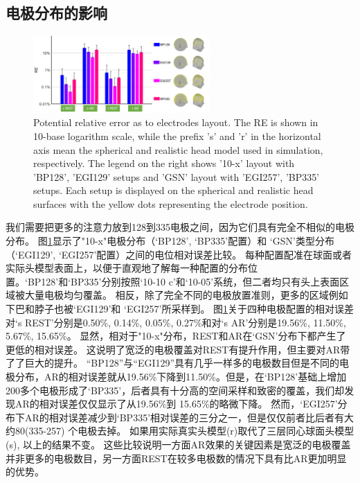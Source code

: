 \subsection{电极分布的影响}
\begin{figure}[h!]
	\centering
	\includegraphics[width=0.6\textwidth,natwidth=610,natheight=642]{pic/JNE/figure5.png}
	\caption{Potential relative error as to electrodes layout. The RE is shown in 10-base logarithm scale, while the prefix 's' and 'r' in the horizontal axis mean the spherical and realistic head model used in simulation, respectively. The legend on the right shows '10-x' layout with 'BP128', 'EGI129' setups and 'GSN' layout with 'EGI257', 'BP335' setups. Each setup is displayed on the spherical and realistic head surfaces with the yellow dots representing the electrode position.}
	\label{2.5}
\end{figure}
我们需要把更多的注意力放到128到335电极之间，因为它们具有完全不相似的电极分布。 图\ref{2.5}显示了"10-x"电极分布（‘BP128’, ‘BP335’配置）和 ‘GSN’类型分布（‘EGI129’, ‘EGI257’配置）之间的电位相对误差比较。 每种配置配准在球面或者实际头模型表面上，以便于直观地了解每一种配置的分布位置。‘BP128’和‘BP335’分别按照‘10-10 c’和‘10-05’系统，但二者均只有头上表面区域被大量电极均匀覆盖。 相反，除了完全不同的电极放置准则，更多的区域例如下巴和脖子也被‘EGI129’和
‘EGI257’所采样到。 图\ref{2.5}关于四种电极配置的相对误差对‘s REST’分别是0.50\%, 0.14\%, 0.05\%, 0.27\%和对‘s AR’分别是19.56\%, 11.50\%, 5.67\%, 15.65\%。 显然，相对于"10-x"分布，REST和AR在‘GSN’分布下都产生了更低的相对误差。 这说明了宽泛的电极覆盖对REST有提升作用，但主要对AR带了了巨大的提升。 “BP128”与“EGI129”具有几乎一样多的电极数目但是不同的电极分布，AR的相对误差就从19.56\%下降到11.50\%。但是，在‘BP128’基础上增加200多个电极形成了‘BP335’，后者具有十分高的空间采样和致密的覆盖，我们却发现AR的相对误差仅仅显示了从19.56\%到 
15.65\%的略微下降。 然而，‘EGI257’分布下AR的相对误差减少到‘BP335’相对误差的三分之一，但是仅仅前者比后者有大约80(335-257) 个电极去掉。 如果用实际真实头模型(r)取代了三层同心球面头模型(s), 以上的结果不变。 这些比较说明一方面AR效果的关键因素是宽泛的电极覆盖并非更多的电极数目，另一方面REST在较多电极数的情况下具有比AR更加明显的优势。

